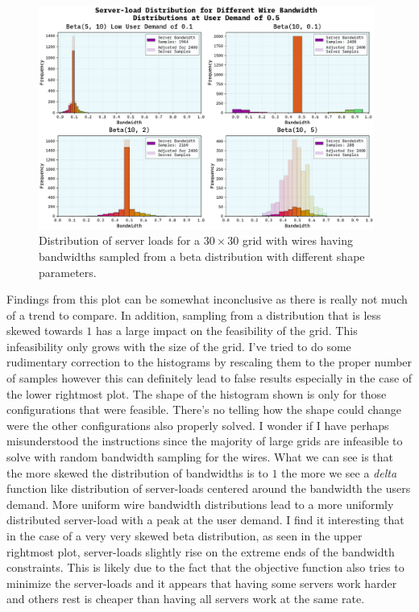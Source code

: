 \documentclass[10pt, titlepage, a4paper]{article}
\begin{document}
\begin{figure}[H]
    \centering
    \includegraphics[width=0.98\textwidth]{../Images/bandwidth-dist.pdf}
    \caption{Distribution of server loads for a $30\times 30$ grid with wires having bandwidths sampled from a beta distribution with different shape parameters.}
    \label{fig:server-load}
\end{figure}

Findings from this plot can be somewhat inconclusive as there is really not much of a trend to compare. In addition, sampling from a distribution that is less skewed towards $1$
has a large impact on the feasibility of the grid. This infeasibility only grows with the size of the grid. I've tried to do some rudimentary correction to the histograms 
by rescaling them to the proper number of samples however this can definitely lead to false results especially in the case of the lower rightmost plot. The shape of the 
histogram shown is only for those configurations that were feasible. There's no telling how the shape could change were the other configurations also properly solved. I wonder if I have perhaps 
misunderstood the instructions since the majority of large grids are infeasible to solve with random bandwidth sampling for the wires.
What we can see is that the more skewed the distribution of bandwidths is to $1$ the more we see a \textit{delta} function like distribution
of server-loads centered around the bandwidth the users demand. More uniform wire bandwidth distributions lead to a more uniformly distributed 
server-load with a peak at the user demand. I find it interesting that in the case of a very very skewed beta distribution, as seen in the 
upper rightmost plot, server-loads slightly rise on the extreme ends of the bandwidth constraints. This is likely due to the fact that the
objective function also tries to minimize the server-loads and it appears that having some servers work harder and others rest is 
cheaper than having all servers work at the same rate. \\
\end{document}
